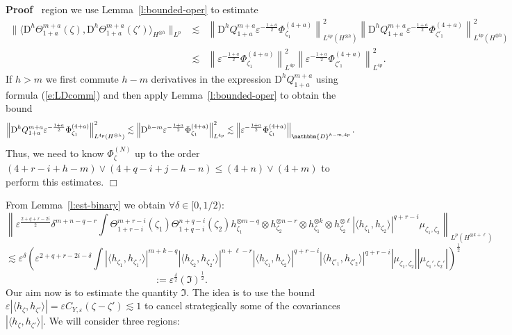 \documentclass[a4paper,11pt]{article}
\newcommand{\assign}{:=}
\newcommand{\mathD}{\mathrm{D}}
\newenvironment{proof}{\noindent\textbf{Proof\ }}{\hspace*{\fill}$\Box$\medskip}
\begin{document}
\begin{proof}
  region we use Lemma~\ref{l:bounded-oper} to estimate
  \begin{eqnarray*}
    \| \langle \mathD^h \Theta_{1 + a}^{m + a} (\zeta), \mathD^h \Theta_{1 +
    a}^{m + a} (\zeta') \rangle_{H^{\otimes h}} \|_{L^p} & \lesssim & \left\|
    \mathD^h Q_{1 + a}^{m + a} \varepsilon^{- \frac{1 + a}{2}} \Phi^{(4 +
    a)}_{\zeta_1} \right\|^2_{L^{4 p} (H^{\otimes h})} \left\| \mathD^h Q_{1 +
    a}^{m + a} \varepsilon^{- \frac{1 + a}{2}} \Phi^{(4 + a)}_{\zeta'_1}
    \right\|^2_{L^{4 p} (H^{\otimes h})}\\
    & \lesssim & \left\| \varepsilon^{- \frac{1 + a}{2}} \Phi^{(4 +
    a)}_{\zeta_1} \right\|_{L^{4 p}}^2 \left\| \varepsilon^{- \frac{1 + a}{2}}
    \Phi^{(4 + a)}_{\zeta'_1} \right\|_{L^{4 p}}^2 .
  \end{eqnarray*}
  If $h > m$ we first commute $h - m$ derivatives in the expression $\mathD^h
  Q_{1 + a}^{m + a}$ using formula (\ref{e:LDcomm}) and then apply
  Lemma~\ref{l:bounded-oper} to obtain the bound
  \[ \left\| \mathD^h Q_{1 + a}^{m + a} \varepsilon^{- \frac{1 + a}{2}}
     \Phi_{\zeta_1}^{(4 + a)} \right\|_{L^{4 p} (H^{\otimes h})}^2 \lesssim
     \left\| \mathD^{h - m} \varepsilon^{- \frac{1 + a}{2}} \Phi_{\zeta_1}^{(4
     + a)} \right\|_{L^{4 p}}^2 \lesssim \left\| \varepsilon^{- \frac{1 +
     a}{2}} \Phi_{\zeta_1}^{(4 + a)} \right\|_{\mathbbm{D}^{h - m, 4 p}} . \]
  Thus, we need to know $\Phi_{\zeta}^{(N)}$ up to the order $(4 + r - i + h -
  m) \vee (4 + q - i + j - h - n) \leqslant (4 + n) \vee (4 + m)$ to perform
  this estimates.
\end{proof}

From Lemma~\ref{l:est-binary} we obtain $\forall \delta \in [0, 1 / 2)$:
\[ \left\| \varepsilon^{\frac{2 + q + r - 2 i}{2}} \delta^{m + n - q - r} \int
   \Theta^{m + r - i}_{1 + r - i} (\zeta_1) \Theta_{1 + q - i}^{n + q - i}
   (\zeta_2) h_{\zeta_1}^{\otimes m - q} \otimes h^{\otimes n - r}_{\zeta_2}
   \otimes h^{\otimes k}_{\zeta_1} \otimes h^{\otimes \ell}_{\zeta_2} |
   \langle h_{\zeta_1}, h_{\zeta_2} \rangle |^{q + r - i} \mu_{\zeta_1,
   \zeta_2} \right\|_{L^p (H^{\otimes k + \ell})} \]
\[ \lesssim \varepsilon^{\delta} \left( \varepsilon^{2 + q + r - 2 i - \delta}
   \int | \langle h_{\zeta_1}, h_{\zeta_1'} \rangle |^{m + k - q} | \langle
   h_{\zeta_2}, h_{\zeta_2'} \rangle |^{n + \ell - r} | \langle h_{\zeta_1},
   h_{\zeta_2} \rangle |^{q + r - i} | \langle h_{\zeta'_1}, h_{\zeta'_2}
   \rangle |^{q + r - i} | \mu_{\zeta_1, \zeta_2} | | \mu_{\zeta_1', \zeta_2'}
   | \right)^{\frac{1}{2}} \]
\[ \assign \varepsilon^{\frac{\delta}{2}} (\mathfrak{I})^{\frac{1}{2}} . \]
Our aim now is to estimate the quantity $\mathfrak{I}$. The idea is to use the
bound $\varepsilon | \langle h_{\zeta}, h_{\zeta'} \rangle | = \varepsilon
C_{Y, \varepsilon} (\zeta - \zeta') \lesssim 1$ to cancel strategically some
of the covariances $| \langle h_{\zeta}, h_{\zeta'} \rangle |$. We will
consider three regions:
\end{document}
